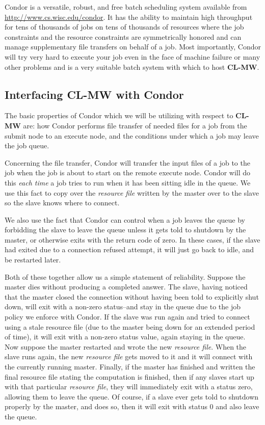 \documentclass[titlepage,12pt]{book}
\newcommand{\xsmall}{\latexhtml{\small}{}}
\newcommand{\xnormalsize}{\latexhtml{\normalsize}{}}
\newcommand{\clmw}{\xsmall\textbf{CL-MW}\xnormalsize\xspace}
\newcommand{\rfile}{\textit{resource file}\xspace}
\begin{document}
Condor is a versatile, robust, and free batch scheduling system
available from \url{http://www.cs.wisc.edu/condor}. It has the ability
to maintain high throughput for tens of thousands of jobs on tens of
thousands of resources where the job constraints and the resource
constraints are symmetrically honored and can manage supplementary
file transfers on behalf of a job. Most importantly, Condor will try
very hard to execute your job even in the face of machine failure or
many other problems and is a very suitable batch system with which
to host \clmw.

\subsection{Interfacing \clmw with Condor}

The basic properties of Condor which we will be utilizing with respect
to \clmw are: how Condor performs file transfer of needed files for
a job from the submit node to an execute node, and the conditions
under which a job may leave the job queue.

Concerning the file transfer, Condor will transfer the input files
of a job to the job when the job is about to start on the remote
execute node. Condor will do this \emph{each time} a job tries to
run when it has been sitting idle in the queue. We use this fact to
copy over the \rfile written by the master over to the slave so the
slave knows where to connect.

We also use the fact that Condor can control when a job leaves the
queue by forbidding the slave to leave the queue unless it gets told
to shutdown by the master, or otherwise exits with the return code
of zero. In these cases, if the slave had exited due to a connection
refused attempt, it will just go back to idle, and be restarted later.

Both of these together allow us a simple statement of reliability.
Suppose the master dies without producing a completed answer.
The slave, having noticed that the master closed the connection
without having been told to explicitly shut down, will exit with
a non-zero status--and stay in the queue due to the job policy
we enforce with Condor.  If the slave was run again and tried to
connect using a stale resource file (due to the master being down
for an extended period of time), it will exit with a non-zero status
value, again staying in the queue.  Now suppose the master restarted
and wrote the new \rfile.  When the slave runs again, the new \rfile
gets moved to it and it will connect with the currently running master.
Finally, if the master has finished and written the final resource
file stating the computation is finished, then if any slaves start up
with that particular \rfile, they will immediately exit with a status
zero, allowing them to leave the queue. Of course, if a slave ever
gets told to shutdown properly by the master, and does so, then it
will exit with status 0 and also leave the queue.
\end{document}
